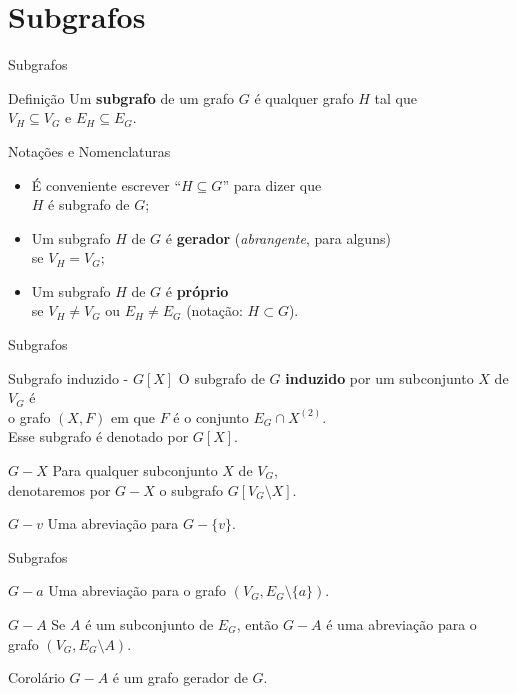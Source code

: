 \documentclass[xcolor=dvipsnames,table]{beamer}
\begin{document}
	\section{Subgrafos}
	\begin{frame}{Subgrafos}
		\begin{block}{Definição}
			Um {\bf subgrafo} de um grafo $G$ é qualquer grafo $H$ tal que \\$V_H \subseteq V_G$ e $E_H \subseteq E_G$.
		\end{block} \pause
		\begin{block}{Notações e Nomenclaturas}
			\begin{itemize}
				\item É conveniente escrever ``$H \subseteq G$'' para dizer que \\$H$ é subgrafo de $G$; \pause
				\item Um subgrafo $H$ de $G$ é {\bf gerador} ({\it abrangente}, para alguns) \\se $V_H = V_G$; \pause
				\item Um subgrafo $H$ de $G$ é {\bf próprio} \\se $V_H \not= V_G$ ou $E_H \not= E_G$ (notação: $H \subset G$).
			\end{itemize}
		\end{block}
	\end{frame}
	
	\begin{frame}{Subgrafos}
		\begin{block}{Subgrafo induzido - $G[X]$}
			O subgrafo de $G$ {\bf induzido} por um subconjunto $X$ de $V_G$ é \\o grafo $(X, F)$ em que $F$ é o conjunto $E_G \cap X^{(2)}$. \\Esse subgrafo é denotado por $G[X]$.
		\end{block} \pause
		\begin{block}{$G - X$}
			Para qualquer subconjunto $X$ de $V_G$, \\denotaremos por $G - X$ o subgrafo $G[V_G \setminus X]$.
		\end{block} \pause
		\begin{block}{$G - v$}
			Uma abreviação para $G - \{ v \}$.
		\end{block}
	\end{frame}
	
	\begin{frame}{Subgrafos}
		\begin{block}{$G - a$}
			Uma abreviação para o grafo $(V_G, E_G \setminus \{ a \})$.
		\end{block} \pause
		\begin{block}{$G - A$}
			Se $A$ é um subconjunto de $E_G$, então $G - A$ é uma abreviação para o grafo $(V_G, E_G \setminus A)$.
		\end{block} \pause
		\begin{block}{Corolário}
			$G - A$ é um grafo gerador de $G$.
		\end{block}
	\end{frame}
	
	\begin{frame}
		\titlepage
	\end{frame}
	
\end{document}
